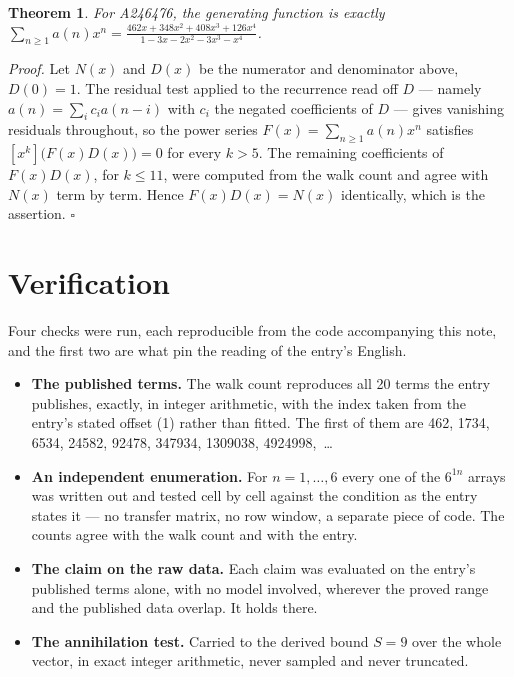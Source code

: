 \documentclass[11pt]{article}
\newtheorem{theorem}{Theorem}
\theoremstyle{definition}
\begin{document}
\begin{theorem} For A246476, the generating function is exactly $\sum_{n\ge 1} a(n)x^n = \frac{462x + 348x^{2} + 408x^{3} + 126x^{4}}{1 - 3x - 2x^{2} - 3x^{3} - x^{4}}$.\end{theorem}

{\itshape Proof.} Let $N(x)$ and $D(x)$ be the numerator and denominator above, $D(0)=1$. The residual test applied to the recurrence read off $D$ --- namely $a(n) = \sum_i c_i a(n-i)$ with $c_i$ the negated coefficients of $D$ --- gives vanishing residuals throughout, so the power series $F(x)=\sum_{n\ge 1}a(n)x^n$ satisfies $[x^k]\bigl(F(x)D(x)\bigr) = 0$ for every $k > 5$. The remaining coefficients of $F(x)D(x)$, for $k \le 11$, were computed from the walk count and agree with $N(x)$ term by term. Hence $F(x)D(x) = N(x)$ identically, which is the assertion. $\square$

\section{Verification}

Four checks were run, each reproducible from the code accompanying this note, and the first two are what pin the reading of the entry's English.

\begin{itemize}

\item {\bfseries The published terms.} The walk count reproduces all 20 terms the entry publishes, exactly, in integer arithmetic, with the index taken from the entry's stated offset (1) rather than fitted. The first of them are 462, 1734, 6534, 24582, 92478, 347934, 1309038, 4924998,~\dots

\item {\bfseries An independent enumeration.} For $n = 1,\dots,6$ every one of the $6^{1n}$ arrays was written out and tested cell by cell against the condition as the entry states it --- no transfer matrix, no row window, a separate piece of code. The counts agree with the walk count and with the entry.

\item {\bfseries The claim on the raw data.} Each claim was evaluated on the entry's published terms alone, with no model involved, wherever the proved range and the published data overlap. It holds there.

\item {\bfseries The annihilation test.} Carried to the derived bound $S = 9$ over the whole vector, in exact integer arithmetic, never sampled and never truncated.

\end{itemize}
\end{document}
